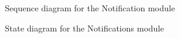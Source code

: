 \documentclass{article}
\begin{document}
			\begin{figure}[H]
				
				\caption{Sequence diagram for the Notification module}
				
			\end{figure}
			
			\begin{figure}[H]
			
				\caption{State diagram for the Notifications module}
			
			\end{figure}
		
\end{document}
